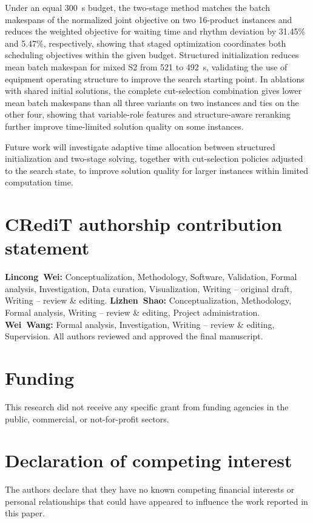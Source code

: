\documentclass[final,5p,times,twocolumn]{elsarticle}
\begin{document}
Under an equal 300~s budget, the two-stage method matches the batch makespans of the normalized joint objective on two 16-product instances and reduces the weighted objective for waiting time and rhythm deviation by 31.45\% and 5.47\%, respectively, showing that staged optimization coordinates both scheduling objectives within the given budget. Structured initialization reduces mean batch makespan for mixed S2 from 521 to 492~s, validating the use of equipment operating structure to improve the search starting point. In ablations with shared initial solutions, the complete cut-selection combination gives lower mean batch makespans than all three variants on two instances and ties on the other four, showing that variable-role features and structure-aware reranking further improve time-limited solution quality on some instances.

Future work will investigate adaptive time allocation between structured initialization and two-stage solving, together with cut-selection policies adjusted to the search state, to improve solution quality for larger instances within limited computation time.

\section*{CRediT authorship contribution statement}
\textbf{Lincong~Wei:} Conceptualization, Methodology, Software, Validation, Formal analysis, Investigation, Data curation, Visualization, Writing -- original draft, Writing -- review \& editing.
\textbf{Lizhen~Shao:} Conceptualization, Methodology, Formal analysis, Writing -- review \& editing, Project administration.
\textbf{Wei~Wang:} Formal analysis, Investigation, Writing -- review \& editing, Supervision. All authors reviewed and approved the final manuscript.

\section*{Funding}
This research did not receive any specific grant from funding agencies in the public, commercial, or not-for-profit sectors.

\section*{Declaration of competing interest}
The authors declare that they have no known competing financial interests or personal relationships that could have appeared to influence the work reported in this paper.
\end{document}
